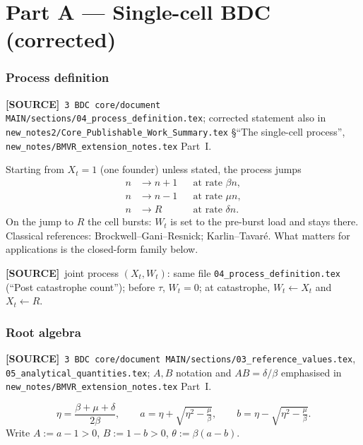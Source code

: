 \documentclass[11pt,a4paper]{article}
\newcommand{\xt}{X_t}
\newcommand{\wt}{W_t}
\newcommand{\Aa}{A}
\newcommand{\Bb}{B}
\theoremstyle{plain}
\theoremstyle{definition}
\theoremstyle{remark}
\newcommand{\SOURCE}{\textcolor{gray!50!black}{\textbf{[SOURCE]}}}
\begin{document}
\part*{Part A --- Single-cell BDC (corrected)}

\section{Process definition}
\label{sec:process}
\SOURCE\
\texttt{3 BDC core/document MAIN/sections/04\_process\_definition.tex};
corrected statement also in
\texttt{new\_notes2/Core\_Publishable\_Work\_Summary.tex} \S``The single-cell process'',
\texttt{new\_notes/BMVR\_extension\_notes.tex} Part~I.

Starting from $\xt=1$ (one founder) unless stated, the process jumps
\begin{align*}
n &\to n+1 &&\text{at rate }\beta n,\\
n &\to n-1 &&\text{at rate }\mu n,\\
n &\to R &&\text{at rate }\delta n.
\end{align*}
On the jump to $R$ the cell bursts: $\wt$ is set to the pre-burst load and stays
there. Classical references: Brockwell--Gani--Resnick; Karlin--Tavar\'e.
What matters for applications is the closed-form family below.

\SOURCE\
joint process $(\xt,\wt)$: same file
\texttt{04\_process\_definition.tex} (``Post catastrophe count'');
before $\tau$, $\wt=0$; at catastrophe, $\wt\leftarrow \xt$ and $\xt\leftarrow R$.

\section{Root algebra}
\label{sec:roots}
\SOURCE\
\texttt{3 BDC core/document MAIN/sections/03\_reference\_values.tex},
\texttt{05\_analytical\_quantities.tex};
$A,B$ notation and $\Aa\Bb=\delta/\beta$ emphasised in
\texttt{new\_notes/BMVR\_extension\_notes.tex} Part~I.

\begin{equation}
\eta=\frac{\beta+\mu+\delta}{2\beta},\qquad
a=\eta+\sqrt{\eta^2-\tfrac{\mu}{\beta}},\qquad
b=\eta-\sqrt{\eta^2-\tfrac{\mu}{\beta}}.
\end{equation}
Write $\Aa:=a-1>0$, $\Bb:=1-b>0$, $\theta:=\beta(a-b)$.
\end{document}
